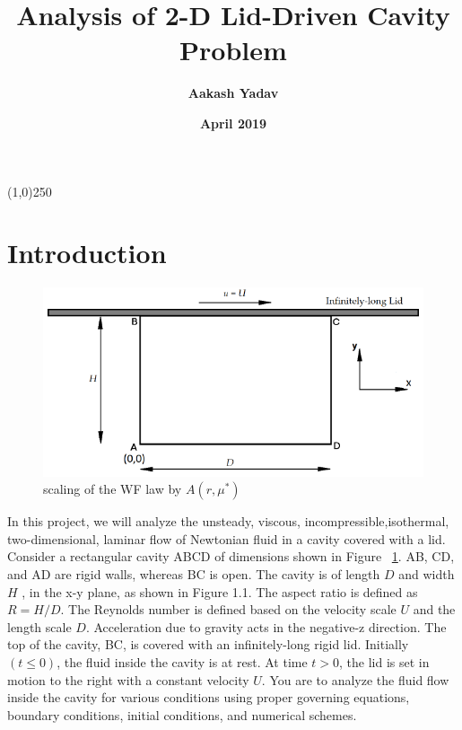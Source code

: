 \documentclass{article}
\title{\textbf{Analysis of 2-D Lid-Driven Cavity Problem}}
\author[1]{\textbf{Aakash Yadav}}
\affil[1]{\textbf{Indian Institute of Technology, Tirupati}}
\date{\textbf{April 2019}}
\begin{document}
\maketitle

\begin{center}
\line(1,0){250}
\end{center}

\section{Introduction}

\begin{figure}[h!]
\centering
\includegraphics[scale=.5]{cavityFig.png}
\caption{scaling of the WF law by $A\left(r,\mu^*\right)$}
\label{fig:cavityFig}
\end{figure}

In this project, we will analyze the unsteady, viscous, incompressible,isothermal, two-dimensional, laminar flow of Newtonian fluid in a cavity covered with a lid. Consider a rectangular cavity ABCD of dimensions shown in Figure ~\ref{fig:cavityFig}. AB, CD, and AD are rigid walls, whereas BC is open. The cavity is of length $D$ and width $H$ , in the x-y plane, as shown in Figure 1.1. The aspect ratio is defined as $R=H/D$. The Reynolds number is defined based on the velocity scale $U$ and the length scale $D$. Acceleration due to gravity acts in the negative-z direction. The top of the cavity, BC, is covered with an infinitely-long rigid lid. Initially $(t \leq 0)$, the fluid inside the cavity is at rest. At time $t > 0$, the lid is set in motion to the right with a constant velocity $U $. You are to analyze the fluid flow inside the cavity for various conditions using proper governing equations, boundary conditions, initial conditions, and numerical schemes.
%
\end{document}
